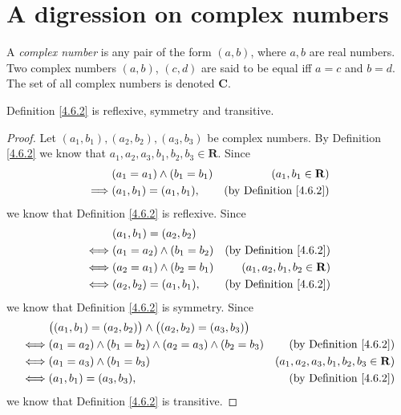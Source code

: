 \section{A digression on complex numbers}\label{sec 4.6}

\setcounter{theorem}{1}
\begin{definition}\label{4.6.2}
    A \emph{complex number} is any pair of the form \((a, b)\), where \(a, b\) are real numbers.
    Two complex numbers \((a, b)\), \((c, d)\) are said to be equal iff \(a = c\) and \(b = d\).
    The set of all complex numbers is denoted \(\mathbf{C}\).
\end{definition}

\begin{additional corollary}\label{ac 4.6.1}
Definition \ref{4.6.2} is reflexive, symmetry and transitive.
\end{additional corollary}

\begin{proof}
    Let \((a_1, b_1), (a_2, b_2), (a_3, b_3)\) be complex numbers.
    By Definition \ref{4.6.2} we know that \(a_1, a_2, a_3, b_1, b_2, b_3 \in \mathbf{R}\).
    Since
    \begin{align*}
                 & (a_1 = a_1) \land (b_1 = b_1) & (a_1, b_1 \in \mathbf{R})          \\
        \implies & (a_1, b_1) = (a_1, b_1),      & \text{(by Definition \ref{4.6.2})}
    \end{align*}
    we know that Definition \ref{4.6.2} is reflexive.
    Since
    \begin{align*}
             & (a_1, b_1) = (a_2, b_2)                                             \\
        \iff & (a_1 = a_2) \land (b_1 = b_2) & \text{(by Definition \ref{4.6.2})}  \\
        \iff & (a_2 = a_1) \land (b_2 = b_1) & (a_1, a_2, b_1, b_2 \in \mathbf{R}) \\
        \iff & (a_2, b_2) = (a_1, b_1),      & \text{(by Definition \ref{4.6.2})}
    \end{align*}
    we know that Definition \ref{4.6.2} is symmetry.
    Since
    \begin{align*}
             & \big((a_1, b_1) = (a_2, b_2)\big) \land \big((a_2, b_2) = (a_3, b_3)\big)                                                 \\
        \iff & (a_1 = a_2) \land (b_1 = b_2) \land (a_2 = a_3) \land (b_2 = b_3)         & \text{(by Definition \ref{4.6.2})}            \\
        \iff & (a_1 = a_3) \land (b_1 = b_3)                                             & (a_1, a_2, a_3, b_1, b_2, b_3 \in \mathbf{R}) \\
        \iff & (a_1, b_1) = (a_3, b_3),                                                  & \text{(by Definition \ref{4.6.2})}
    \end{align*}
    we know that Definition \ref{4.6.2} is transitive.
\end{proof}

